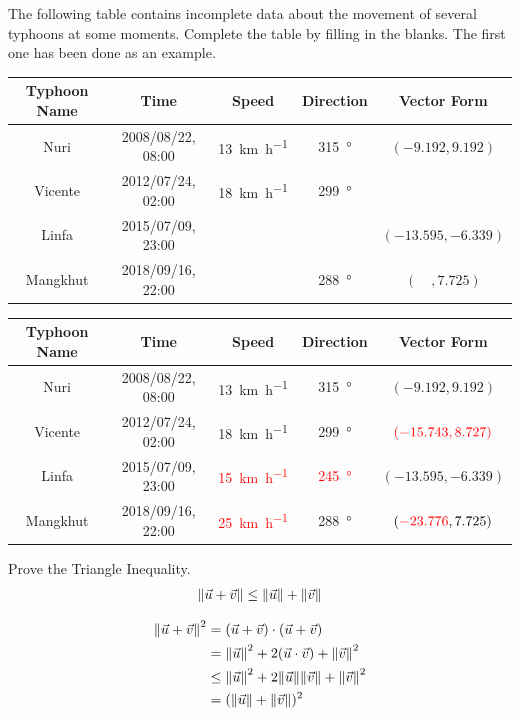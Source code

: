\begin{Exercise}
The following table contains incomplete data about the movement of several typhoons at some moments. Complete the table by filling in the blanks. The first one has been done as an example.
\begin{center}
\footnotesize
\begin{tabular}{|c|c|c|c|c|}
\hline
Typhoon Name & Time & Speed & Direction & Vector Form\\
\hline
Nuri & 2008/08/22, 08:00 & \SI{13}{\km \per \hour} & \SI{315}{\degree} & $(-9.192, 9.192)$\\
\hline
Vicente & 2012/07/24, 02:00 & \SI{18}{\km \per \hour} & \SI{299}{\degree} & \\
\hline
Linfa & 2015/07/09, 23:00 & & & $(-13.595, -6.339)$\\
\hline
Mangkhut & 2018/09/16, 22:00 & & \SI{288}{\degree} & $(\quad, 7.725)$\\
\hline
\end{tabular}
\end{center}
\end{Exercise}
\begin{Answer}
\begin{center}
\footnotesize
\begin{tabular}{|c|c|c|c|c|}
\hline
Typhoon Name & Time & Speed & Direction & Vector Form\\
\hline
Nuri & 2008/08/22, 08:00 & \SI{13}{\km \per \hour} & \SI{315}{\degree} & $(-9.192, 9.192)$\\
\hline
Vicente & 2012/07/24, 02:00 & \SI{18}{\km \per \hour} & \SI{299}{\degree} & $\textcolor{red}{(-15.743, 8.727)}$\\
\hline
Linfa & 2015/07/09, 23:00 & \textcolor{red}{\SI{15}{\km \per \hour}} & \textcolor{red}{\SI{245}{\degree}} & $(-13.595, -6.339)$\\
\hline
Mangkhut & 2018/09/16, 22:00 & \textcolor{red}{\SI{25}{\km \per \hour}} & \SI{288}{\degree} & $(\textcolor{red}{-23.776}, 7.725)$\\
\hline
\end{tabular}
\end{center}    
\end{Answer}

\begin{Exercise}
\label{ex:triangular}
Prove the Triangle Inequality.
\begin{align}
\norm{\vec{u} + \vec{v}} \leq \norm{\vec{u}} + \norm{\vec{v}}
\end{align}
\end{Exercise}
\begin{Answer}
\begin{align*}
\norm{\vec{u} + \vec{v}}^2 &= (\vec{u} + \vec{v}) \cdot (\vec{u} + \vec{v}) \\
&= \norm{\vec{u}}^2 + 2(\vec{u}\cdot\vec{v}) + \norm{\vec{v}}^2 \\
&\leq \norm{\vec{u}}^2 + 2\norm{\vec{u}}\norm{\vec{v}} + \norm{\vec{v}}^2 \\
&= (\norm{\vec{u}} + \norm{\vec{v}})^2
\end{align*}
\end{Answer}

